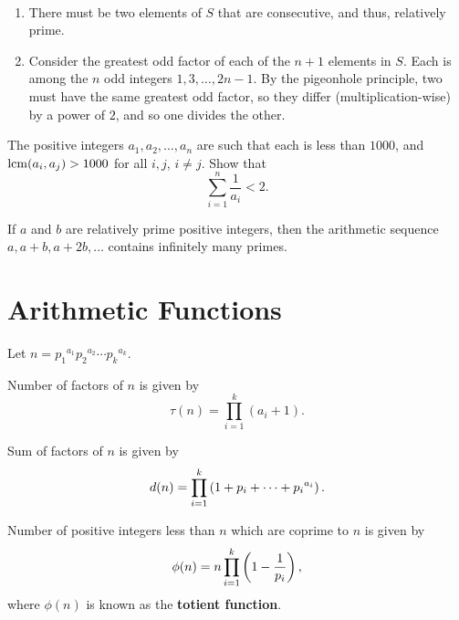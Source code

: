 \begin{solution} \
\begin{enumerate}[label=(\alph*)]
\item There must be two elements of $S$ that are consecutive, and thus, relatively prime.
\item Consider the greatest odd factor of each of the $n+1$ elements in $S$. Each is among the $n$ odd integers $1,3,\dots,2n-1$. By the pigeonhole principle, two must have the same greatest odd factor, so they differ (multiplication-wise) by a power of $2$, and so one divides the other.
\end{enumerate}
\end{solution}

\begin{exercise}
The positive integers $a_1,a_2,\dots,a_n$ are such that each is less than $1000$, and $\operatorname*{lcm}(a_i,a_j)>1000$ for all $i,j$, $i\neq j$. Show that
\[\sum_{i=1}^{n}\frac{1}{a_i}<2.\]
\end{exercise}

\begin{solution}

\end{solution}

\begin{theorem}
If $a$ and $b$ are relatively prime positive integers, then the arithmetic sequence $a,a+b,a+2b,\dots$ contains infinitely many primes.
\end{theorem}

\section{Arithmetic Functions}
Let $n={p_1}^{a_1}{p_2}^{a_2}\cdots{p_k}^{a_k}$.
\begin{lemma}
Number of factors of $n$ is given by
\begin{equation}
\tau(n)=\prod_{i=1}^k(a_i+1).
\end{equation}
\end{lemma}

\begin{lemma}
Sum of factors of $n$ is given by
\begin{equation}
d(n)=\prod_{i=1}^k\left(1+p_i+\cdots+{p_i}^{a_i}\right).
\end{equation}
\end{lemma}

\begin{lemma}
Number of positive integers less than $n$ which are coprime to $n$ is given by
\begin{equation}
\phi(n)=n\prod_{i=1}^k\left(1-\frac{1}{p_i}\right),
\end{equation}
where $\phi(n)$ is known as the \textbf{totient function}.
\end{lemma}

